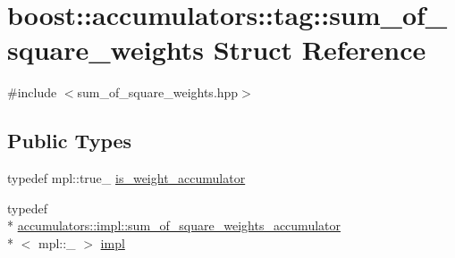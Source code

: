\hypertarget{structboost_1_1accumulators_1_1tag_1_1sum__of__square__weights}{\section{boost\-:\-:accumulators\-:\-:tag\-:\-:sum\-\_\-of\-\_\-square\-\_\-weights Struct Reference}
\label{structboost_1_1accumulators_1_1tag_1_1sum__of__square__weights}
}


{\ttfamily \#include $<$sum\-\_\-of\-\_\-square\-\_\-weights.\-hpp$>$}

\subsection*{Public Types}
\begin{DoxyCompactItemize}
\item 
typedef mpl\-::true\-\_\- \hyperlink{structboost_1_1accumulators_1_1tag_1_1sum__of__square__weights_aa1b4145dd1d30517a31fc2b139a4d831}{is\-\_\-weight\-\_\-accumulator}
\item 
typedef \\*
\hyperlink{structboost_1_1accumulators_1_1impl_1_1sum__of__square__weights__accumulator}{accumulators\-::impl\-::sum\-\_\-of\-\_\-square\-\_\-weights\-\_\-accumulator}\\*
$<$ mpl\-::\-\_ $>$ \hyperlink{structboost_1_1accumulators_1_1tag_1_1sum__of__square__weights_a1b17755b77e02ad2286bcace0dcb9109}{impl}
\end{DoxyCompactItemize}


